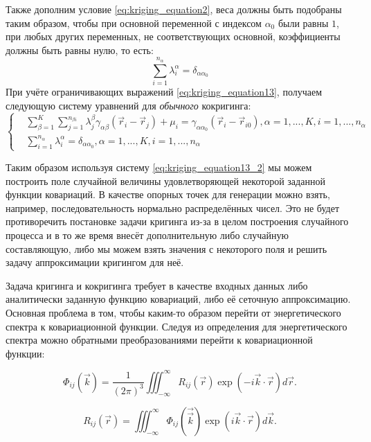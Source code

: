 Также дополним условие \eqref{eq:kriging_equation2}, веса должны быть подобраны таким образом, чтобы при основной переменной с индексом $\alpha_0$ были равны $1$, при любых других переменных, не соответствующих основной, коэффициенты должны быть равны нулю, то есть:
\begin{equation}
    \label{eq:kriging_equation13}
    \sum_{i = 1}^{n_\alpha} \lambda_i^{\alpha} = \delta_{\alpha \alpha_0}
\end{equation}
При учёте ограничивающих выражений \eqref{eq:kriging_equation13}, получаем следующую систему уравнений для \textit{обычного} кокригинга:
\[ 
\left\{
  \begin{array}{rl}
  \label{eq:kriging_equation13_2}
	&\sum_{\beta=1}^K \sum_{j = 1}^{n_{\beta i}} \lambda_j^{\beta} \gamma_{\alpha \beta}(\vec r_i - \vec r_j) + \mu_i = \gamma_{\alpha \alpha_0}(\vec r_i - \vec r_{i0}), \alpha = 1, ..., K, i = 1,...,n_\alpha \\
	&\sum_{i = 1}^{n_\alpha} \lambda_i^{\alpha} = \delta_{\alpha \alpha_0}, \alpha = 1, ..., K, i = 1,...,n_\alpha
  \end{array}
\right.
\]

Таким образом используя систему \ref{eq:kriging_equation13_2} мы можем построить поле случайной величины удовлетворяющей некоторой заданной функции ковариаций. В качестве опорных точек для генерации можно взять, например, последовательность нормально распределённых чисел. Это не будет противоречить постановке задачи кригинга из-за в целом построения случайного процесса и в то же время внесёт дополнительную либо случайную составляющую, либо мы можем взять значения с некоторого поля и решить задачу аппроксимации кригингом для неё. 

Задача кригинга и кокригинга требует в качестве входных данных либо аналитически заданную функцию ковариаций, либо её сеточную аппроксимацию. Основная проблема в том, чтобы каким-то образом перейти от энергетического спектра к ковариационной функции. Следуя из определения для энергетического спектра \cite{pope2000turbulent} можно обратными преобразованиями перейти  к ковариационной функции:

\begin{equation}
    \label{eq:kriging_equation14}
    \Phi_{ij}(\vec{k}) = \frac{1}{(2 \pi)^3} \iiint_{-\infty}^{\infty} R_{ij}(\vec{r}) \exp{(- i \vec{k} \cdot \vec{r})} d\vec{r}.
\end{equation}

\begin{equation}
    \label{eq:kriging_equation14_2}
    R_{ij}(\vec{r}) = \iiint_{-\infty}^{\infty}  \Phi_{ij}(\vec{\vec k}) \exp{(i \vec k \cdot \vec r)} d \vec k.
\end{equation}

